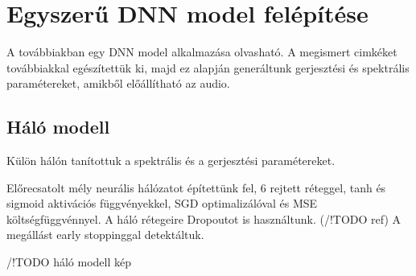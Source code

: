 \section{Egyszerű DNN model felépítése}
\label{dnn_model}
A továbbiakban egy DNN model alkalmazása olvasható. A megismert cimkéket továbbiakkal egészítettük ki, majd ez alapján generáltunk gerjesztési és spektrális paramétereket, amikből előállítható az audio.

\subsection{Háló modell}
Külön hálón tanítottuk a spektrális és a gerjesztési paramétereket. 

Előrecsatolt mély neurális hálózatot építettünk fel, 6 rejtett réteggel, tanh és sigmoid aktivációs függvényekkel, SGD optimalizálóval és MSE költségfüggvénnyel. A háló rétegeire Dropoutot is használtunk. (/!TODO ref)
A megállást early stoppinggal detektáltuk.

/!TODO háló modell kép